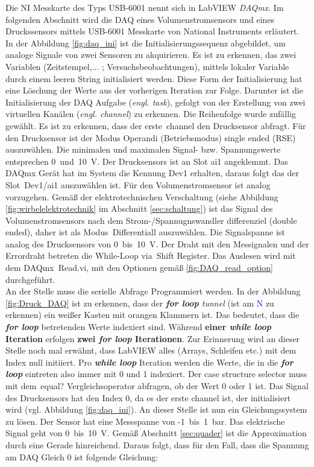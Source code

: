 Die NI Messkarte des Typs USB-6001 nennt sich in LabVIEW \textit{DAQmx}. Im folgenden Abschnitt wird die DAQ eines Volumenstromsensors und eines Druckssensors mittels USB-6001 Messkarte von National Instruments erläutert. In der Abbildung \ref{fig:daq_ini} ist die Initialisierungssequenz abgebildet, um analoge Signale von zwei Sensoren zu akquirieren. Es ist zu erkennen, das zwei Variablen (Zeitstempel,... ; Versuchsbeobachtungen), mittels lokaler Variable durch einem leeren String initialisiert werden.  Diese Form der Initialisierung hat eine Löschung der Werte aus der vorherigen Iteration zur Folge. Darunter ist die Initialisierung der DAQ Aufgabe (\textit{engl. task}), gefolgt von der Erstellung von zwei virtuellen Kanälen (\textit{engl. channel}) zu erkennen. Die Reihenfolge wurde zufällig gewählt. Es ist zu erkennen, dass der erste \,{\Menlo channel} den Drucksensor abfragt. Für den Drucksensor ist der Modus Operandi (Betriebsmodus) single ended ({\Menlo RSE}) auszuwählen. Die minimalen und maximalen Signal- bzw. Spannungswerte entsprechen 0~und~10~V. Der Drucksensors ist an Slot {\Menlo ai1} angeklemmt. Das DAQmx Gerät hat im System die Kennung {\Menlo Dev1} erhalten, daraus folgt das der Slot {\Menlo \,Dev1/ai1} auszuwählen ist. Für den Volumenstromsensor ist analog vorzugehen. Gemäß der elektrotechnischen Verschaltung (siehe Abbildung \ref{fig:wirbelelektrotechnik} im Abschnitt \ref{sec:schaltung}) ist das Signal des Volumenstromsensors nach dem Strom-/Spannugnswandler differenziel (double ended), daher ist als Modus \,{\Menlo Differentiall} auszuwählen.  Die Signalspanne ist analog des Drucksensors von 0~bis~10~V. Der Draht mit den Messignalen und der Errordraht betreten die While-Loop via \,{\Menlo Shift Register}. Das Auslesen wird mit dem {\Menlo DAQmx~Read.vi}, mit den Optionen gemäß \ref{fig:DAQ_read_option} durchgeführt.\\



An der Stelle muss die serielle Abfrage Programmiert werden. In der Abbildung \ref{fig:Druck_DAQ} ist zu erkennen, dass der \textit{\textbf{for loop} tunnel} (ist am \textcolor{blue}{{\Menlo N}} zu erkennen) ein weißer Kasten mit orangen Klammern ist. Das bedeutet, dass die \textbf{\textit{for loop}} betretenden Werte indexiert sind. Während \textbf{einer \textit{while loop} Iteration} erfolgen \textbf{zwei \textit{for loop} Iterationen}. Zur Erinnerung wird an dieser Stelle noch mal erwähnt, dass LabVIEW alles (Arrays, Schleifen etc.) mit dem Index null initiiert. Pro \textit{\textbf{while loop}} Iteration werden die Werte, die in die \textbf{\textit{for loop}} eintreten  also immer mit 0 und 1 indexiert. Der case structure selector muss mit dem \,{\Menlo equal?} Vergleichsoperator abfragen, ob der Wert 0 oder 1 ist. Das Signal des Drucksensors hat den Index 0, da es der erste channel ist, der initialisiert wird (vgl. Abbildung \ref{fig:daq_ini}). An dieser Stelle ist nun ein Gleichungssystem zu lösen. Der Sensor hat eine Messspanne von -1~bis~1~bar. Das elektrische Signal geht von 0~bis~10~V. Gemäß Abschnitt \ref{sec:quader} ist die Approximation durch eine Gerade hinreichend. Daraus folgt, dass für den Fall, dass die Spannung am DAQ Gleich 0 ist folgende Gleichung:

